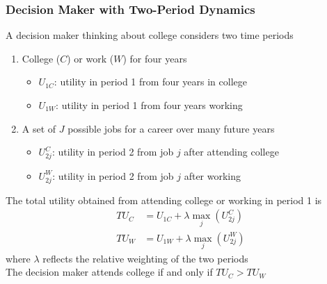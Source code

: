 \documentclass{beamer}
\begin{document}
\begin{frame}\frametitle{Decision Maker with Two-Period Dynamics}
    A decision maker thinking about college considers two time periods
    \begin{enumerate}
        \item College ($C$) or work ($W$) for four years
        \begin{itemize}
            \item $U_{1C}$: utility in period 1 from four years in college
            \item $U_{1W}$: utility in period 1 from four years working
        \end{itemize}
        \item A set of $J$ possible jobs for a career over many future years
        \begin{itemize}
            \item $U_{2j}^C$: utility in period 2 from job $j$ after attending college
            \item $U_{2j}^W$: utility in period 2 from job $j$ after working
        \end{itemize}
    \end{enumerate}
    \vspace{2ex}
    The total utility obtained from attending college or working in period 1 is
    \begin{align*}
        TU_C & = U_{1C} + \lambda \max_j(U_{2j}^C) \\
        TU_W & = U_{1W} + \lambda \max_j(U_{2j}^W)
    \end{align*}
    where $\lambda$ reflects the relative weighting of the two periods \\
    \vspace{2ex}
    The decision maker attends college if and only if $TU_C > TU_W$
\end{frame}
\end{document}
